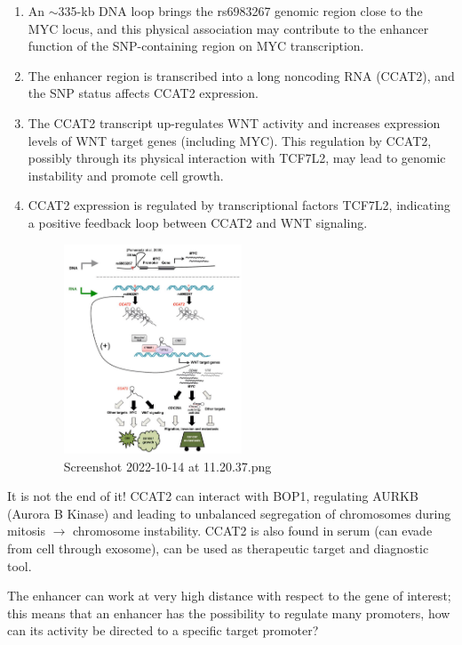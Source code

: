 \begin{enumerate}
\def\labelenumi{\arabic{enumi}.}
\item
  An $\sim$335-kb DNA loop brings the rs6983267 genomic region close to the MYC locus, and this physical association may contribute to the enhancer function of the SNP-containing region on MYC transcription.
\item
  The enhancer region is transcribed into a long noncoding RNA (CCAT2), and the SNP status affects CCAT2 expression.
\item
  The CCAT2 transcript up-regulates WNT activity and increases expression levels of WNT target genes (including MYC). This regulation by CCAT2, possibly through its physical interaction with TCF7L2, may lead to genomic instability and promote cell growth.
\item
  CCAT2 expression is regulated by transcriptional factors TCF7L2, indicating a positive feedback loop between CCAT2 and WNT signaling.

  \begin{figure}
  \centering
  \includegraphics[width=0.5\textwidth]{../_resources/Screenshot_2022-10-14_at_11-20-37.png}
  \caption{Screenshot 2022-10-14 at 11.20.37.png}
  \end{figure}
\end{enumerate}

It is not the end of it! CCAT2 can interact with BOP1, regulating AURKB (Aurora B Kinase) and leading to unbalanced segregation of chromosomes during mitosis $\rightarrow$ chromosome instability. CCAT2 is also found in serum (can evade from cell through exosome), can be used as therapeutic target and diagnostic tool.

The enhancer can work at very high distance with respect to the gene of interest; this means that an enhancer has the possibility to regulate many promoters, how can its activity be directed to a specific target promoter?

